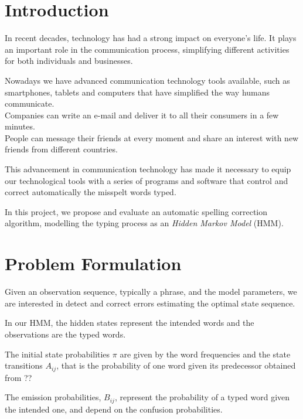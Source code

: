 \chapter{Introduction}
\label{chap:Introduction}

In recent decades, technology has had a strong impact on everyone's life.
It plays an important role in the communication process, simplifying 
different activities for both individuals and businesses.

Nowadays we have advanced communication technology tools available, 
such as smartphones, tablets and computers that have simplified the way 
humans communicate. \\
Companies can write an e-mail and deliver it to all their consumers in a few 
minutes. \\
People can message their friends at every moment and share an interest 
with new friends from different countries.

This advancement in communication technology has made it necessary to 
equip our technological tools with a series of programs and software that 
control and correct automatically the misspelt words typed.

In this project, we propose and evaluate an automatic spelling correction 
algorithm, modelling the typing process as an \textit{Hidden Markov 
Model} (HMM). 


\chapter{Problem Formulation} %
Given an observation sequence, typically a phrase, and the model 
parameters, we are interested in detect and correct errors estimating the 
optimal state sequence. %

In our HMM, the hidden states represent the intended words and the 
observations are the typed words. 

The initial state probabilities $\pi$ are given by the word frequencies and 
the state transitions $A_{ij}$, that is the probability of one word given 
its predecessor obtained from ?? %

The emission probabilities, $B_{ij}$, represent the probability of a typed 
word given the intended one, and depend on the confusion probabilities.



